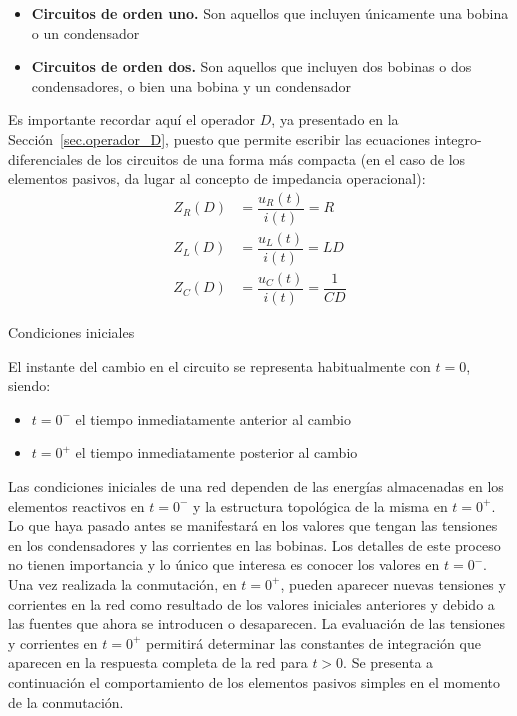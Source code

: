 \documentclass[11pt]{book} %
\makeatletter
\numberwithin{dummy}{section}
\theoremstyle{ocrenumbox}
\theoremstyle{blacknumex}
\theoremstyle{blacknumbox}
\theoremstyle{ocrenum}
\newenvironment{remark}{\par\vspace{10pt}\small %
\begin{list}{}{
\leftmargin=35pt %
\rightmargin=25pt}\item\ignorespaces %
\makebox[-2.5pt]{\begin{tikzpicture}[overlay]
\node[draw=ocre!60,line width=1pt,circle,fill=ocre!25,font=\sffamily\bfseries,inner sep=2pt,outer sep=0pt] at (-15pt,0pt){\textcolor{ocre}{N}};\end{tikzpicture}} %
\advance\baselineskip -1pt}{\end{list}\vskip5pt} %
\renewcommand{\section}{\@startsection{section}{1}{\z@}
{-4ex \@plus -1ex \@minus -.4ex}
{1ex \@plus.2ex }
{\normalfont\large\sffamily\bfseries}}
\newlength\esp
\makeatother
\begin{document}
	\begin{itemize}
	    \item \textbf{Circuitos de orden uno.} Son aquellos que incluyen únicamente una bobina o un condensador
	    \item \textbf{Circuitos de orden dos.} Son aquellos que incluyen dos bobinas o dos condensadores, o bien una bobina y  un condensador
	\end{itemize}

	\begin{remark}
	    Es importante recordar aquí el operador $D$, ya presentado en la Sección~\ref{sec.operador_D}, puesto que permite escribir las ecuaciones integro-diferenciales de los circuitos de una forma más compacta (en el caso de los elementos pasivos, da lugar al concepto de impedancia operacional):
	\begin{align*}
	    Z_R(D)&=\dfrac{u_R(t)}{i(t)}=R\\
	    Z_L(D)&=\dfrac{u_L(t)}{i(t)}=LD\\
	    Z_C(D)&=\dfrac{u_C(t)}{i(t)}=\dfrac{1}{CD}
	\end{align*}
	\end{remark}
		
	
	
	\section{Condiciones iniciales}\label{sec.condiciones_iniciales}
	
	El instante del cambio en el circuito se representa habitualmente con $t = 0$, siendo:
    \begin{itemize}
    \item $t = 0^-$ el tiempo inmediatamente anterior al cambio
    \item $t = 0^+$ el tiempo inmediatamente posterior al cambio
    \end{itemize}
	Las condiciones iniciales de una red dependen de las energías almacenadas en los elementos reactivos en $t=0^-$ y la estructura topológica de la misma en $t=0^+$. Lo que haya pasado antes se manifestará en los valores que tengan las tensiones en los condensadores y las corrientes en las bobinas. Los detalles de este proceso no tienen importancia y lo único que interesa es conocer los valores en $t=0^-$. Una vez realizada la conmutación, en $t=0^+$, pueden aparecer nuevas tensiones y corrientes en la red como resultado de los valores iniciales anteriores y debido a las fuentes que ahora se introducen o desaparecen. La evaluación de las tensiones y corrientes en $t=0^+$ permitirá determinar las constantes de integración que aparecen en la respuesta completa de la red para $t>0$. Se presenta a continuación el comportamiento de los elementos pasivos simples en el momento de la conmutación.
	
\end{document}

